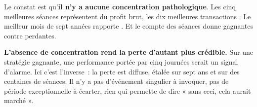 Le constat est qu'\textbf{il n'y a aucune concentration pathologique}. Les
cinq meilleures séances représentent \XTenTopFiveDaysShare{} du profit brut,
les dix meilleures transactions \XTenTopTenTradesShare. Le meilleur mois de
sept années rapporte \XTenBestMonthPnl. Et le compte des séances donne
\XTenProfitableSessions{} gagnantes contre \XTenLosingSessions{} perdantes.

\begin{warningbox}
\textbf{L'absence de concentration rend la perte d'autant plus crédible.} Sur
une stratégie gagnante, une performance portée par cinq journées serait un
signal d'alarme. Ici c'est l'inverse~: la perte est diffuse, étalée sur sept
ans et sur des centaines de séances. Il n'y a pas d'événement singulier à
invoquer, pas de période exceptionnelle à écarter, rien qui permette de dire
« sans ceci, cela aurait marché ».
\end{warningbox}

